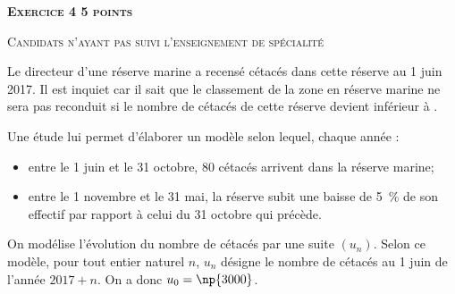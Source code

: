 \documentclass[10pt,a4paper]{article}
\begin{document}
\newpage

\vspace{0,5cm}\textbf{\textsc{Exercice 4 \hfill 5 points}}

\smallskip
\textsc{Candidats n'ayant pas suivi l'enseignement de spécialité}

\bigskip

Le directeur d'une réserve marine a recensé  cétacés dans cette réserve au 1 juin 2017. Il est inquiet car il sait que le classement de la zone en \og réserve marine\fg{} ne sera pas reconduit si le nombre de cétacés de cette réserve devient inférieur à .

\smallskip

Une étude lui permet d'élaborer un modèle selon lequel, chaque année :

\begin{itemize}
\item entre le 1 juin et le 31 octobre, 80 cétacés arrivent dans la réserve marine;
\item entre le 1 novembre et le 31 mai, la réserve subit une baisse de 5~\% de son effectif par rapport à celui du 31 octobre qui précède.
\end{itemize}

On modélise l'évolution du nombre de cétacés par une suite $(u_n)$. Selon ce modèle, pour tout entier naturel $n$, $u_n$ désigne le nombre de cétacés au 1 juin de l'année $2017+n$. On a donc $u_0 = \np{3000}$.

\medskip
\end{document}
